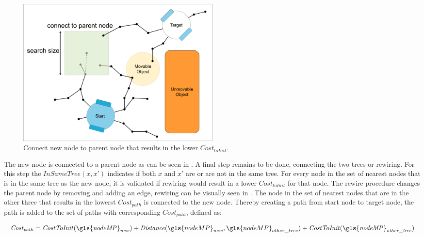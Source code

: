 \begin{figure}[H]
    \centering
    \includegraphics[width=0.5\textwidth, cfbox=my_yellow 5pt 0pt]{figures/required_background/mp/4mp_connect_to_tree.drawio.png}
    \caption{Connect new node to parent node that results in the lower $\mathit{Cost_{toInit}}$.}%
    \label{fig:motion_planner_adding_one_node_two}
\end{figure}

The new node is connected to a parent node as can be seen in . A final step remains to be done, connecting the two trees or rewiring. For this step the $\mathit{InSameTree}(x, x')$ indicates if both $x$ and $x'$ are or are not in the same tree. For every node in the set of nearest nodes that is in the same tree as the new node, it is validated if rewiring would result in a lower $\mathit{Cost_{toInit}}$ for that node. The rewire procedure changes the parent node by removing and adding an edge, rewiring can be visually seen in . The node in the set of nearest nodes that are in the other three that results in the lowerst $\mathit{Cost_{path}}$ is connected to the new node. Thereby creating a path from start node to target node, the path is added to the set of paths with corresponding $\mathit{Cost}_\mathit{path}$, defined as:\bs

\[\mathit{Cost_{path}} = \mathit{CostToInit(\gls{nodeMP}_{new})} + \mathit{Distance}(\gls{nodeMP}_{new}, \gls{nodeMP}_{other\_tree}) +\mathit{CostToInit(\gls{nodeMP}_{other\_tree})} \]

